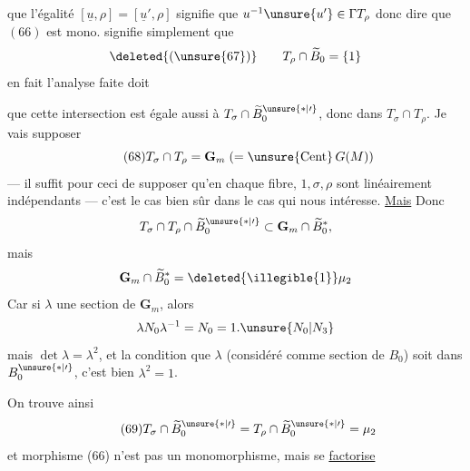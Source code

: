  que l'égalité $[\underline u,\rho]=[\underline u',\rho]$ signifie que $u^{-1}\unsure{u'}\in\Gamma T_\rho$ donc  dire que $(66)$ est mono. signifie simplement que
\[
\deleted{(\unsure{67})}\qquad T_\rho\cap\widetilde B_0=\{1\}
\]
en fait l'analyse faite doit 


que cette intersection est égale aussi à $T_\sigma\cap\widetilde B_0^{\unsure{*|\prime}}$, donc  dans $T_\sigma\cap T_\rho$. Je vais supposer
\[
\tag{68}
T_\sigma\cap T_\rho=\mathbf G_m\;(=\unsure{\mathrm{Cent}}\,G(M))
\]
--- il suffit pour ceci de supposer qu'en chaque fibre, $1,\sigma,\rho$ sont linéairement indépendants --- c'est le cas bien sûr dans le cas qui nous intéresse. \uline{Mais} Donc
\[
T_\sigma\cap T_\rho\cap\widetilde B_0^{\unsure{*|\prime}}\subset\mathbf G_m\cap\widetilde B_0^*,
\]
mais
\[
\mathbf G_m\cap\widetilde B_0^*=\deleted{\illegible{1}}\mu_2
\]
Car si $\lambda$  une section  de $\mathbf G_m$, alors
\[
\lambda N_0\lambda^{-1}=N_0=1.\unsure{N_0|N_3}
\]
mais $\det\lambda=\lambda^2$, et la condition que $\lambda$  (considéré comme section de $B_0$) soit dans $B_0^{\unsure{*|\prime}}$, c'est bien \uline{$\lambda^2=1$}. 

On trouve  ainsi
\[
\tag{69}
T_\sigma\cap\widetilde B_0^{\unsure{*|\prime}}=T_\rho\cap\widetilde B_0^{\unsure{*|\prime}}=\mu_2
\]
et  morphisme (66) n'est pas un monomorphisme, mais se \uline{factorise}



